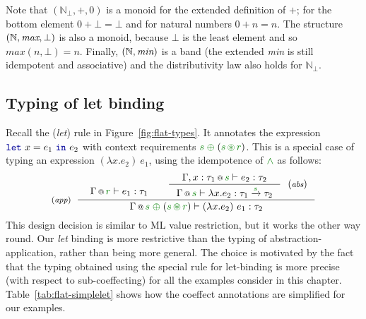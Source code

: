 \noindent
Note that $(\mathbb{N}_{\bot}, +, 0)$ is a monoid for the extended definition of $+$; for the
bottom element $0 + \bot = \bot$ and for natural numbers $0 + n = n$. The structure 
$(\mathbb{N}, \emph{max}, \bot)$ is also a monoid, because $\bot$ is the least element and so
$\mathit{max}(n, \bot) = n$. Finally,  $(\mathbb{N}, \emph{min})$ is a band (the extended
\emph{min} is still idempotent and associative) and the distributivity law also holds
for $\mathbb{N}_{\bot}$.


\subsection{Typing of let binding}
\label{sec:flat-calculus-let}

Recall the (\emph{let}) rule in Figure~\ref{fig:flat-types}. It annotates the expression 
$\kvd{let}~x=e_1~\kvd{in}~e_2$ with context requirements $\cclrd{s}\;\cpar\;(\cclrd{s}\,\cseq\,\cclrd{r})$.
This is a special case of typing an expression $(\lambda x.e_2)~e_1$, using the idempotence
of $\czip$ as follows:
%
\begin{equation*}
\tyrule{app}
  {\begin{array}{l}
   \vspace{-1.5em}
   \coctx{\Gamma}{\cclrd{r}} \vdash e_1 : \tau_1
   \end{array} &
   \tyruler{abs}
       { \coctx{\Gamma, x:\tau_1}{\cclrd{s}} \vdash e_2 : \tau_2 }
       { \coctx{\Gamma}{\cclrd{s}} \vdash \lambda x.e_2 : \tau_1 \xrightarrow{\cclrd{s}} \tau_2 } }
  { \coctx{\Gamma}{\cclrd{s}\;\cpar\;(\cclrd{s}\,\cseq\,\cclrd{r})} \vdash (\lambda x.e_2)~e_1 : \tau_2 }    
\end{equation*}
%
This design decision is similar to ML value restriction, but it works the other way round. Our
\emph{let} binding is more restrictive than the typing of abstraction-application, rather than
being more general. The choice is motivated by the fact that the typing obtained using the special 
rule for let-binding is more precise (with respect to sub-coeffecting) for all the examples consider 
in this chapter. Table~\ref{tab:flat-simplelet} shows how the coeffect annotations are simplified 
for our examples.

